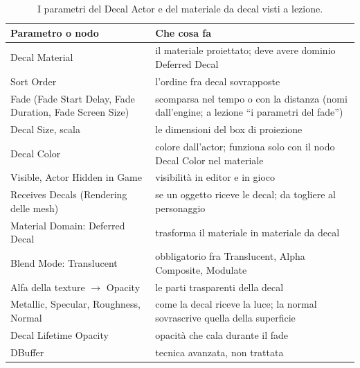 \begin{table}[htbp]
\centering
\small
\begin{tabular}{@{}p{4.4cm}p{9.6cm}@{}}
\toprule
\textbf{Parametro o nodo} & \textbf{Che cosa fa} \\
\midrule
Decal Material & il materiale proiettato; deve avere dominio Deferred Decal \\
Sort Order & l'ordine fra decal sovrapposte \\
Fade (Fade Start Delay, Fade Duration, Fade Screen Size) & scomparsa nel tempo o con la
distanza (nomi dall'engine; a lezione ``i parametri del fade'') \\
Decal Size, scala & le dimensioni del box di proiezione \\
Decal Color & colore dall'actor; funziona solo con il nodo Decal Color nel materiale \\
Visible, Actor Hidden in Game & visibilità in editor e in gioco \\
Receives Decals (Rendering delle mesh) & se un oggetto riceve le decal; da togliere al
personaggio \\
Material Domain: Deferred Decal & trasforma il materiale in materiale da decal \\
Blend Mode: Translucent & obbligatorio fra Translucent, Alpha Composite, Modulate \\
Alfa della texture $\rightarrow$ Opacity & le parti trasparenti della decal \\
Metallic, Specular, Roughness, Normal & come la decal riceve la luce; la normal sovrascrive
quella della superficie \\
Decal Lifetime Opacity & opacità che cala durante il fade \\
DBuffer & tecnica avanzata, non trattata \\
\bottomrule
\end{tabular}
\caption{I parametri del Decal Actor e del materiale da decal visti a lezione.}
\label{ue16:tab:decal}
\end{table}

